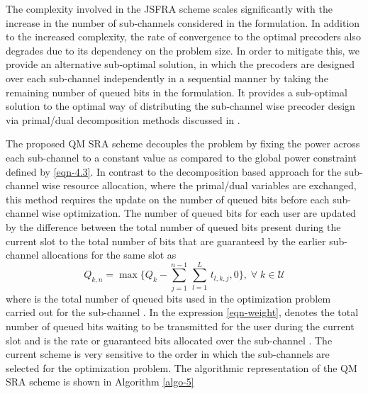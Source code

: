 
The complexity involved in the \ac{JSFRA} scheme scales significantly with the increase in the number of sub-channels considered in the formulation. In addition to the increased complexity, the rate of convergence to the optimal precoders also degrades due to its dependency on the problem size. In order to mitigate this, we provide an alternative sub-optimal solution, in which the precoders are designed over each sub-channel independently in a sequential manner by taking the remaining number of queued bits in the formulation. It provides a sub-optimal solution to the optimal way of distributing the sub-channel wise precoder design via primal/dual decomposition methods discussed in \cite{palomar2006tutorial,boyd2011distributed}.

The proposed \acf{QM} \ac{SRA} scheme decouples the problem by fixing the power across each sub-channel to a constant value  as compared to the global power constraint defined by \eqref{eqn-4.3}. In contrast to the decomposition based approach for the sub-channel wise resource allocation, where the primal/dual variables are exchanged, this method requires the update on the number of queued bits before each sub-channel wise optimization. The number of queued bits for each user are updated by the difference between the total number of queued bits present during the current slot to the total number of bits that are guaranteed by the earlier sub-channel allocations for the same slot as
\begin{equation}
Q_{k,n} = \max{\Big \lbrace Q_k - \sum_{j = 1}^{n-1} \, \sum_{l = 1}^{L} \, t_{l,k,j} ,0 \Big \rbrace }, \; \forall \; k \in \mathcal{U}
\label{eqn-weight}
\end{equation}
where  is the total number of queued bits used in the optimization problem carried out for the sub-channel . In the expression \eqref{eqn-weight},  denotes the total number of queued bits waiting to be transmitted for the user  during the current slot and  is the rate or guaranteed bits allocated over the sub-channel . The current scheme is very sensitive to the order in which the sub-channels are selected for the optimization problem. The algorithmic representation of the \acf{QM} \ac{SRA} scheme is shown in Algorithm \ref{algo-5}
